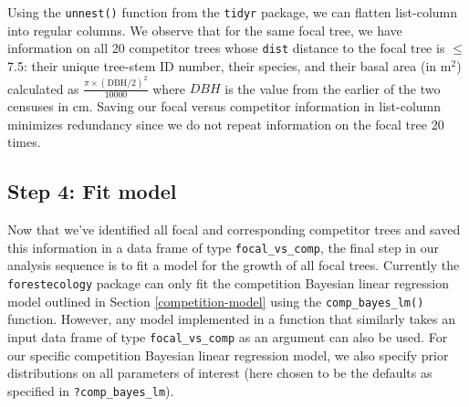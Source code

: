 \documentclass[12pt]{article}
\newenvironment{Shaded}{\begin{snugshade}}{\end{snugshade}}
\newcommand{\CommentTok}[1]{\textcolor[rgb]{0.56,0.35,0.01}{\textit{#1}}}
\newcommand{\DataTypeTok}[1]{\textcolor[rgb]{0.13,0.29,0.53}{#1}}
\newcommand{\DecValTok}[1]{\textcolor[rgb]{0.00,0.00,0.81}{#1}}
\newcommand{\KeywordTok}[1]{\textcolor[rgb]{0.13,0.29,0.53}{\textbf{#1}}}
\newcommand{\NormalTok}[1]{#1}
\newcommand{\OperatorTok}[1]{\textcolor[rgb]{0.81,0.36,0.00}{\textbf{#1}}}
\newcommand{\StringTok}[1]{\textcolor[rgb]{0.31,0.60,0.02}{#1}}
\begin{document}
Using the \texttt{unnest()} function from the \texttt{tidyr} package, we
can flatten list-column into regular columns. We observe that for the
same focal tree, we have information on all 20 competitor trees whose
\texttt{dist} distance to the focal tree is \(\leq\) 7.5: their unique
tree-stem ID number, their species, and their basal area (in m\(^2\))
calculated as \(\frac{\pi \times (\text{DBH/2})^2}{10000}\) where
\(DBH\) is the value from the earlier of the two censuses in cm. Saving
our focal versus competitor information in list-column minimizes
redundancy since we do not repeat information on the focal tree 20
times.

\begin{Shaded}
\end{Shaded}

\hypertarget{model-fit-predict}{%
\subsection{Step 4: Fit model}\label{model-fit-predict}}

Now that we've identified all focal and corresponding competitor trees
and saved this information in a data frame of type
\texttt{focal\_vs\_comp}, the final step in our analysis sequence is to
fit a model for the growth of all focal trees. Currently the
\texttt{forestecology} package can only fit the competition Bayesian
linear regression model outlined in Section \ref{competition-model}
using the \texttt{comp\_bayes\_lm()} function. However, any model
implemented in a function that similarly takes an input data frame of
type \texttt{focal\_vs\_comp} as an argument can also be used. For our
specific competition Bayesian linear regression model, we also specify
prior distributions on all parameters of interest (here chosen to be the
defaults as specified in \texttt{?comp\_bayes\_lm}).
\end{document}
